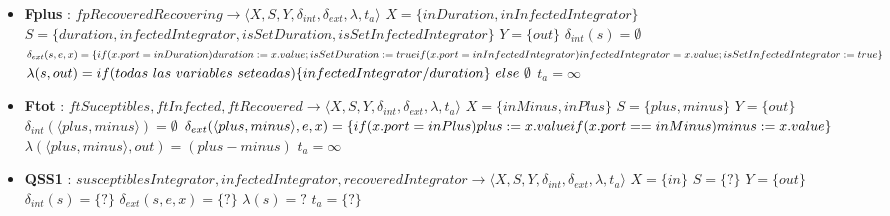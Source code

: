 \begin{itemize}
\item \textbf{Fplus} : $ fpRecoveredRecovering \rightarrow \langle X, S, Y, \delta_{int}, \delta_{ext}, \lambda, t_{a} \rangle$ \newline
$ X = \{ inDuration, inInfectedIntegrator \} $ \newline
$ S = \{ duration, infectedIntegrator, isSetDuration, isSetInfectedIntegrator \} $ \newline
$ Y = \{ out \} $ \newline
$ \delta_{int}(s) = \emptyset $ \newline
$ \delta_{ext}(s, e, x) = \{
\\if (x.port = inDuration) duration := x.value; isSetDuration := true
\\if (x.port = inInfectedIntegrator) infectedIntegrator = x.value; \\isSetInfectedIntegrator := true 
\} $ \newline
$ \lambda(s, out) = if(todas \ las \ variables \ seteadas) \{ 
\\infectedIntegrator/duration\} \ else \ \emptyset$ \newline
$ t_{a} = \infty $

\item \textbf{Ftot} : $ ftSuceptibles, ftInfected, ftRecovered \rightarrow \langle X, S, Y, \delta_{int}, \delta_{ext}, \lambda, t_{a} \rangle$ \newline
$ X = \{ inMinus, inPlus \} $ \newline
$ S = \{ plus, minus \} $ \newline
$ Y = \{ out \} $ \newline
$ \delta_{int}(\langle plus, minus \rangle) = \emptyset $ \newline
$ \delta_{ext}(\langle plus, minus \rangle, e, x) = \{ 
\\if (x.port = inPlus) plus := x.value
\\if (x.port == inMinus) minus := x.value
\} $ \newline
$ \lambda(\langle plus, minus \rangle, out) = (plus - minus) $ \newline
$ t_{a} = \infty $ 


\item \textbf{QSS1} : $ susceptiblesIntegrator, infectedIntegrator, recoveredIntegrator  \rightarrow \langle X, S, Y, \delta_{int}, \delta_{ext}, \lambda, t_{a} \rangle$ \newline
$ X = \{ in \} $ \newline
$ S = \{ ? \} $ \newline
$ Y = \{ out \} $ \newline
$ \delta_{int}(s) = \{ ? \} $ \newline
$ \delta_{ext}(s, e, x) = \{ ? \} $ \newline
$ \lambda(s) = ? $ \newline
$ t_{a} = \{ ? \} $ 
\end{itemize}


